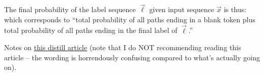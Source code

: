 \documentclass[11pt]{article}
\begin{document}
\begin{comment}
It's worth emphasizing how to interpret these, given we've imposed this weird augmented label sequence. In as-verbose-as-possible terms, 
\begin{quote}
{\bfseries
$\alpha_t(s)$ is the probability, after running our RNN for $t$ time steps to produce the path $\slice[t]{\pi}$, that $\mathcal{B}(\slice[t]{\pi}){==}\slice[ \frac{s - 1}{2} ]{\ell}$  for which, after inserting $\epsilon$ between all elements of $\slice[ \frac{s-1}{2} ]{\ell}$, we obtain the augmented labeling $\slice[s]{\ell}'$.
}
\end{quote}

\p The way you should think about the different possible cases here is that, at time step $t$, in order for there to be nonzero probability that we can merge the sequence of $t$ RNN outputs into the augmented label sequence $\slice[s]{\ell}'$, it must be true that:
\begin{compactitem}
\item We emit the token $\ell'_s$ at time $t$ from the RNN. 

\item At the previous timestep, $t  - 1$, we emitted a token consistent with our rules for merging combined with the fact that we've inserted $\epsilon$ between every pair of tokens in the final output labeling $\vec\ell$, in order to produce $\vec{\ell}'$. 
\end{compactitem}
The weird case (in my opinion) to consider is realizing that we can emit, for example, the label $a$ at time $t - 1$, then the label $b$ at time $t$, and this would eventually get mapped to a portion of the augmented label sequence, $[a, \epsilon, b]$. 
\end{comment}

The final probability of the label sequence $\vec\ell$ given input sequence $\vec x$ is thus:
which  corresponds to ``total probability of all paths ending in a blank token plus total probability of all paths ending in the final label of $\vec\ell$.''




\myspace
{}
\myspace

Notes on \href{https://distill.pub/2017/ctc/}{this distill article} (note that I do NOT recommending reading this article -- the wording is horrendously confusing compared to what's actually going on). 
\end{document}
